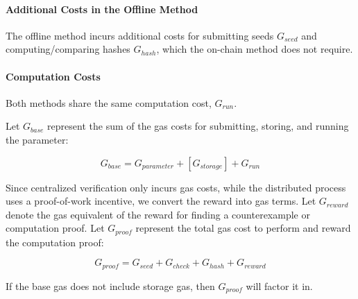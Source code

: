 \documentclass[runningheads]{llncs}
\begin{document}
\paragraph*{Additional Costs in the Offline Method} The offline method incurs additional costs for submitting seeds \( G_{seed} \) and computing/comparing hashes \( G_{hash} \), which the on-chain method does not require.

\paragraph*{Computation Costs} Both methods share the same computation cost, \( G_{run} \).

Let \( G_{base} \) represent the sum of the gas costs for submitting, storing, and running the parameter:

\[
G_{base} = G_{parameter} + [G_{storage}] + G_{run}
\]

Since centralized verification only incurs gas costs, while the distributed process uses a proof-of-work incentive, we convert the reward into gas terms. Let \( G_{reward} \) denote the gas equivalent of the reward for finding a counterexample or computation proof. Let \( G_{proof} \) represent the total gas cost to perform and reward the computation proof:

\[
G_{proof} = G_{seed} + G_{check} + G_{hash} + G_{reward}
\]

If the base gas does not include storage gas, then \( G_{proof} \) will factor it in.
\end{document}
